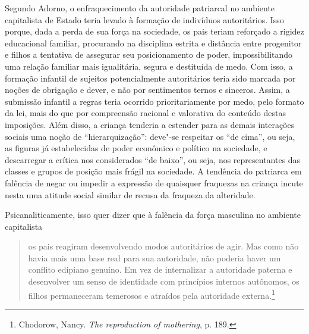 Segundo Adorno, o enfraquecimento da autoridade patriarcal no ambiente
capitalista de Estado teria levado à formação de indivíduos
autoritários. Isso porque, dada a perda de sua força na sociedade, os
pais teriam reforçado a rigidez educacional familiar, procurando na
disciplina estrita e distância entre progenitor e filhos a tentativa de
assegurar seu posicionamento de poder, impossibilitando uma relação
familiar mais igualitária, segura e destituída de medo. Com isso, a
formação infantil de sujeitos potencialmente autoritários teria sido
marcada por noções de obrigação e dever, e não por sentimentos ternos e
sinceros. Assim, a submissão infantil a regras teria ocorrido
prioritariamente por medo, pelo formato da lei, mais do que por
compreensão racional e valorativa do conteúdo destas imposições. Além
disso, a criança tenderia a estender para as demais interações sociais
uma noção de ``hierarquização'': deve"-se respeitar os ``de cima'', ou
seja, as figuras já estabelecidas de poder econômico e político na
sociedade, e descarregar a crítica nos considerados ``de baixo'', ou
seja, nos representantes das classes e grupos de posição mais frágil na
sociedade. A tendência do patriarca em falência de negar ou impedir a
expressão de quaisquer fraquezas na criança incute nesta uma atitude
social similar de recusa da fraqueza da alteridade.

Psicanaliticamente, isso quer dizer que à falência da força masculina no
ambiente capitalista

\begin{quote}
os pais reagiram desenvolvendo modos autoritários de agir. Mas como não
havia mais uma base real para sua autoridade, não poderia haver um
conflito edipiano genuíno. Em vez de internalizar a autoridade paterna e
desenvolver um senso de identidade com princípios internos autônomos, os
filhos permaneceram temerosos e atraídos pela autoridade
externa.\footnote{Chodorow, Nancy. \emph{The reproduction of mothering}, p. 189.}
\end{quote}

